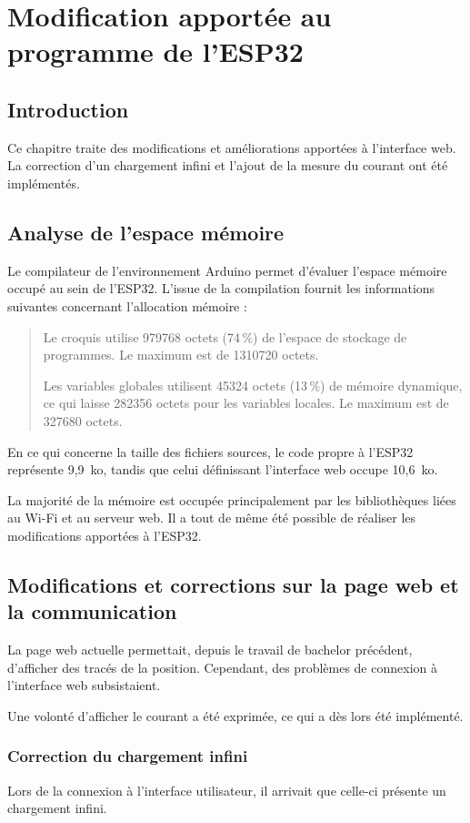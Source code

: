 \chapter{Modification apportée au programme de l'ESP32}

\section{Introduction}
Ce chapitre traite des modifications et améliorations apportées à l'interface web. La correction d'un chargement infini et l'ajout de la mesure du courant ont été implémentés.

\section{Analyse de l'espace mémoire}
Le compilateur de l'environnement Arduino permet d'évaluer l'espace mémoire occupé au sein de l'ESP32. L'issue de la compilation fournit les informations suivantes concernant l'allocation mémoire :

\begin{quote}
  Le croquis utilise 979768 octets (74\,\%) de l'espace de stockage de programmes. Le maximum est de 1310720 octets.

  Les variables globales utilisent 45324 octets (13\,\%) de mémoire dynamique, ce qui laisse 282356 octets pour les variables locales. Le maximum est de 327680 octets.
\end{quote}

En ce qui concerne la taille des fichiers sources, le code propre à l'ESP32 représente 9,9~ko, tandis que celui définissant l'interface web occupe 10,6~ko.

La majorité de la mémoire est occupée principalement par les bibliothèques liées au Wi-Fi et au serveur web. Il a tout de même été possible de réaliser les modifications apportées à l'ESP32.

\section{Modifications et corrections sur la page web et la communication}
La page web actuelle permettait, depuis le travail de bachelor précédent, d'afficher des tracés de la position. Cependant, des problèmes de connexion à l'interface web subsistaient.

Une volonté d'afficher le courant a été exprimée, ce qui a dès lors été implémenté.

\subsection{Correction du chargement infini}
Lors de la connexion à l'interface utilisateur, il arrivait que celle-ci présente un chargement infini.

